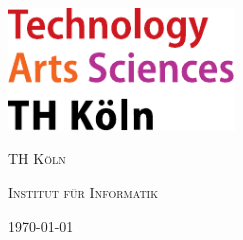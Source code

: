 
\begin{titlepage}
	\centering
	\includegraphics[width=0.45\textwidth]{../../../assets/logo_th_koeln.pdf}\par\vspace{1cm}
	{\scshape\LARGE TH Köln \par}
	\vspace{1cm}
	{\scshape\Large Institut für Informatik\par}
	\vspace{1.5cm}
	{\huge\bfseries <| title |>\par}

	\vfill

	{\large \today\par}
\end{titlepage}